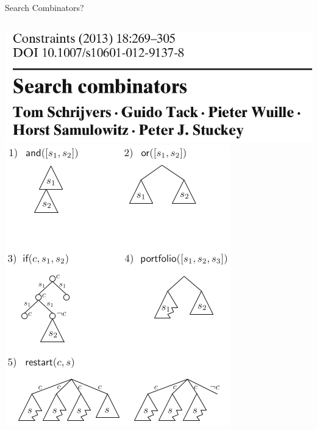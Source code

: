 \documentclass{beamer}
\begin{document}
\begin{frame}{Search Combinators?}
    \begin{columns}[T]
        \centering\includegraphics*[keepaspectratio=true,scale=0.12]{sc-title.png}
        \vspace{1em}
        \centering\includegraphics*[keepaspectratio=true,scale=0.27]{sc-primitives.png}


\end{columns}
\end{frame}
\end{document}

